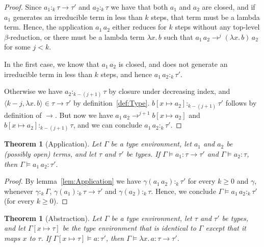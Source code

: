 \documentclass[10pt,a4paper,final,twocolumn]{article}
\theoremstyle{definition}
\theoremstyle{plain}
\newtheorem{theorem}[definition]{Theorem}
\newcommand{\abstr}[2]{\ensuremath{\lambda{#1}.\,{#2}}}
\newcommand{\app}[2]{\ensuremath{{#1}\,{#2}}}
\newcommand{\pair}[1]{\ensuremath{\langle{#1}\rangle}}
\begin{document}
\begin{proof}
  Since \mbox{$a_1 :_k \tau \to \tau'$} and \mbox{$a_2 :_k \tau$} we have that both $a_1$ and $a_2$ are closed,
  and if $a_1$ generates an irreducible term in less than $k$ steps, that term must be a lambda
  term. Hence, the application \mbox{$\app{a_1}{a_2}$} either reduces for $k$ steps without any top-level
  $\beta$-reduction, or there must be a lambda term \mbox{$\abstr{x}{b}$} such that
  \mbox{$\app{a_1}{a_2} \to^j \app{(\abstr{x}{b})}{a_2}$} for some \mbox{$j < k$}.

  In the first case, we know that \mbox{$\app{a_1}{a_2}$} is closed, and does not generate an irreducible
  term in less than $k$ steps, and hence \mbox{$\app{a_1}{a_2} :_k \tau'$}.

  Otherwise we have \mbox{$a_2 :_{k-(j+1)} \tau$} by closure under decreasing index, and
  \mbox{$\pair{k-j,\abstr{x}{b}} \in \tau \to \tau'$} by definition~\ref{def:Type}.
  \mbox{$b[x \mapsto a_2] :_{k-(j+1)} \tau'$} follows by definition of $\to$. But now we have
  \mbox{$\app{a_1}{a_2} \to^{j+1} b[x \mapsto a_2]$} and \mbox{$b[x \mapsto a_2] :_{k-(j+1)} \tau$}, and
  we can conclude $\app{a_1}{a_2} :_k \tau'$.
\end{proof}

\begin{theorem}[Application] \label{thm:Application}
  Let $\Gamma$ be a type environment, let $a_1$ and $a_2$ be (possibly open) terms, and let
  $\tau$ and $\tau'$ be types. If \mbox{$\Gamma \models a_1 : \tau \to \tau'$} and
  \mbox{$\Gamma \models a_2 : \tau$}, then \mbox{$\Gamma \models \app{a_1}{a_2} : \tau'$}.
\end{theorem}

\begin{proof}
  By lemma~\ref{lem:Application} we have \mbox{$\gamma(\app{a_1}{a_2}) :_k \tau'$} for every $k \ge 0$
  and $\gamma$, whenever \mbox{$\gamma :_k \Gamma$},
  \mbox{$\gamma(a_1) :_k \tau \to \tau'$} and \mbox{$\gamma(a_2) :_k \tau$}. Hence, we conclude
  \mbox{$\Gamma \models \app{a_1}{a_2} :_k \tau'$} (for every $k \ge 0$).
\end{proof}

\begin{theorem}[Abstraction] \label{thm:Abstraction}
  Let $\Gamma$ be a type environment, let $\tau$ and $\tau'$ be types, and let $\Gamma[x \mapsto \tau]$
  be the type environment that is identical to $\Gamma$ except that it maps $x$ to $\tau$. If
  \mbox{$\Gamma[x \mapsto \tau] \models a : \tau'$}, then
  \mbox{$\Gamma \models \abstr{x}{a} : \tau \to \tau'$}.
\end{theorem}
\end{document}
